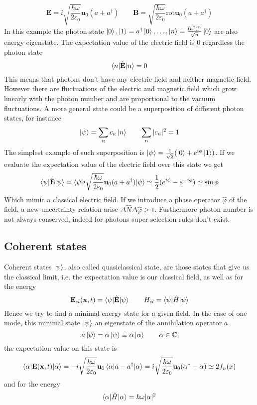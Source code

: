 \documentclass[12pt]{article}
\theoremstyle{plain}
\newcommand{\C}{\mathbb{C}}
\newcommand{\x}{\mathbf{x}}
\theoremstyle{definition}
\theoremstyle{remark}
\begin{document}
\[\mathbf{E} = i\sqrt{\frac{\hbar \omega}{2\varepsilon_0}} \mathbf{u}_0(a+a^\dagger)\qquad \mathbf{B} = \sqrt{\frac{\hbar \omega}{2\varepsilon_0}}\text{rot}\mathbf{u}_0(a+a^\dagger) \]
In this example the photon state $\ket{0},\ket{1} = a^\dagger \ket{0},\dots,\ket{n} = \frac{(a^\dagger)^n}{\sqrt{n}}\ket{0}$ are also energy eigenstate. The expectation value of the electric field is 0 regardless the photon state
\[\braket{n|\hat{\mathbf{E}}|n} = 0\]
This means that photons don't have any electric field and neither magnetic field. However there are fluctuations of the electric and magnetic field which grow linearly with the photon number and are proportional to the vacuum fluctuations. A more general state could be a superposition of different photon states, for instance
\[\ket{\psi} = \sum_n c_n \ket{n} \qquad \sum_n |c_n|^2 = 1\]
The simplest example of such superposition is $\ket{\psi} = \frac{1}{\sqrt{2}}(\ket{0} + e^{i\phi} \ket{1})$.  If we evaluate the expectation value of the electric field over this state we get
\[\braket{\psi|\hat{\mathbf{E}}|\psi} = \braket{\psi|i\sqrt{\frac{\hbar \omega}{2\varepsilon_0}} \mathbf{u}_0(a+a^\dagger)|\psi} \simeq \frac{1}{2} (e^{i\phi}-e^{-i\phi}) \simeq \sin\phi \]
Which mimic a classical electric field. If we introduce a phase operator $\hat{\varphi}$ of the field, a new uncertainty relation arise $\Delta \hat{N} \Delta \hat{\varphi} \ge 1$. Furthermore photon number is not always conserved, indeed for photons super selection rules don't exist.
\subsection{Coherent states}
Coherent states $\ket{\psi}$, also called quasiclassical state, are those states that give us the classical limit, i.e. the expectation value is our classical field, as well as for the energy
\[\mathbf{E}_{cl}(\x,t) = \braket{\psi|\hat{\mathbf{E}}|\psi} \qquad H_{cl} = \braket{\psi|\hat{H}|\psi} \]
Hence we try to find a minimal energy state for a given field. In the case of one mode, this minimal state $\ket{\psi}$  an eigenstate of the annihilation operator $a$.
\[a\ket{\psi} = \alpha \ket{\psi}\equiv \alpha\ket{\alpha} \qquad \alpha\in\C\] 
the expectation value on this state is
\[\braket{\alpha|\mathbf{E}(\x,t)|\alpha} = -i \sqrt{\frac{\hbar \omega}{2\varepsilon_0}} \mathbf{u}_0\braket{\alpha|a-a^\dagger |\alpha} = i \sqrt{\frac{\hbar \omega}{2\varepsilon_0}} \mathbf{u}_0 (\alpha^* - \alpha) \simeq 2f_n(x)\]
and for the energy
\[\braket{\alpha|\hat{H}|\alpha} = \hbar \omega |\alpha|^2\]
\end{document}
